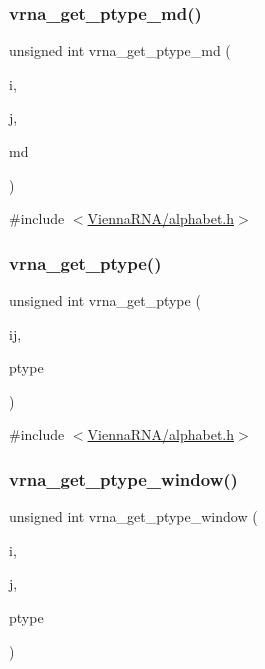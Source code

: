 \subsubsection{\texorpdfstring{vrna\+\_\+get\+\_\+ptype\+\_\+md()}{vrna\_get\_ptype\_md()}}
{\footnotesize\ttfamily unsigned int vrna\+\_\+get\+\_\+ptype\+\_\+md (\begin{DoxyParamCaption}\item[{int}]{i,  }\item[{int}]{j,  }\item[{\mbox{\hyperlink{group__model__details_ga1f8a10e12a0a1915f2a4eff0b28ea17c}{vrna\+\_\+md\+\_\+t}} $\ast$}]{md }\end{DoxyParamCaption})}



{\ttfamily \#include $<$\mbox{\hyperlink{alphabet_8h}{Vienna\+R\+N\+A/alphabet.\+h}}$>$}

\mbox{\label{group__utils_ga1cef98562ce6016ed83e38bc15d7b4bb}} 
\subsubsection{\texorpdfstring{vrna\+\_\+get\+\_\+ptype()}{vrna\_get\_ptype()}}
{\footnotesize\ttfamily unsigned int vrna\+\_\+get\+\_\+ptype (\begin{DoxyParamCaption}\item[{int}]{ij,  }\item[{char $\ast$}]{ptype }\end{DoxyParamCaption})}



{\ttfamily \#include $<$\mbox{\hyperlink{alphabet_8h}{Vienna\+R\+N\+A/alphabet.\+h}}$>$}

\mbox{\label{group__utils_gab134b2a70a6933b7f3aada9abdc7b96e}} 
\subsubsection{\texorpdfstring{vrna\+\_\+get\+\_\+ptype\+\_\+window()}{vrna\_get\_ptype\_window()}}
{\footnotesize\ttfamily unsigned int vrna\+\_\+get\+\_\+ptype\+\_\+window (\begin{DoxyParamCaption}\item[{int}]{i,  }\item[{int}]{j,  }\item[{char $\ast$$\ast$}]{ptype }\end{DoxyParamCaption})}



